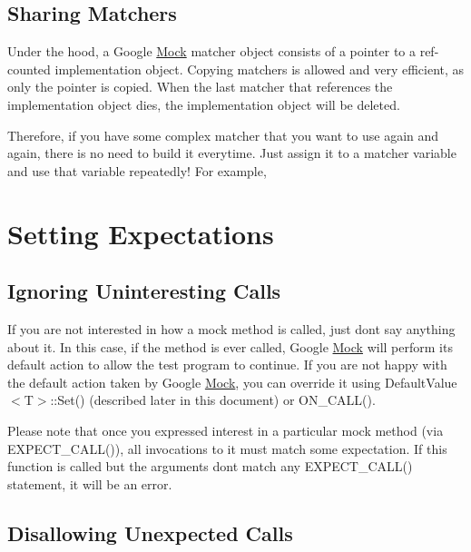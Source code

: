 \subsection*{Sharing Matchers}

Under the hood, a Google \mbox{\hyperlink{class_mock}{Mock}} matcher object consists of a pointer to a ref-\/counted implementation object. Copying matchers is allowed and very efficient, as only the pointer is copied. When the last matcher that references the implementation object dies, the implementation object will be deleted.

Therefore, if you have some complex matcher that you want to use again and again, there is no need to build it everytime. Just assign it to a matcher variable and use that variable repeatedly! For example,


\begin{DoxyCode}{0}
\end{DoxyCode}


\section*{Setting Expectations}

\subsection*{Ignoring Uninteresting Calls}

If you are not interested in how a mock method is called, just don\textquotesingle{}t say anything about it. In this case, if the method is ever called, Google \mbox{\hyperlink{class_mock}{Mock}} will perform its default action to allow the test program to continue. If you are not happy with the default action taken by Google \mbox{\hyperlink{class_mock}{Mock}}, you can override it using {\ttfamily Default\+Value$<$T$>$\+::\+Set()} (described later in this document) or {\ttfamily O\+N\+\_\+\+C\+A\+L\+L()}.

Please note that once you expressed interest in a particular mock method (via {\ttfamily E\+X\+P\+E\+C\+T\+\_\+\+C\+A\+L\+L()}), all invocations to it must match some expectation. If this function is called but the arguments don\textquotesingle{}t match any {\ttfamily E\+X\+P\+E\+C\+T\+\_\+\+C\+A\+L\+L()} statement, it will be an error.

\subsection*{Disallowing Unexpected Calls}

